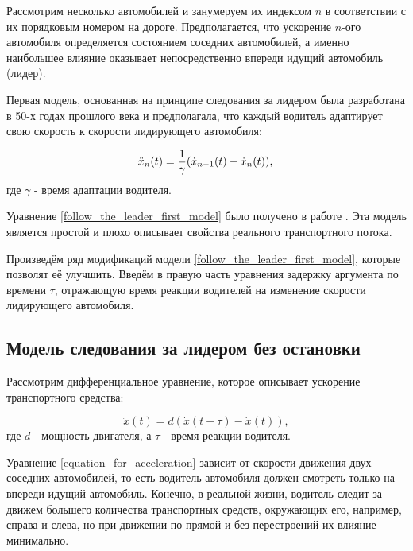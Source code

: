 \documentclass[12pt, a4paper]{extarticle}
\numberwithin{equation}{section}
\begin{document}
Рассмотрим несколько автомобилей и занумеруем их индексом $n$ в соответствии с их порядковым номером на дороге. Предполагается, что ускорение $n$-ого автомобиля определяется состоянием соседних автомобилей, а именно наибольшее влияние оказывает непосредственно впереди идущий автомобиль (лидер).

Первая модель, основанная на принципе следования за лидером была разработана в 50-х годах прошлого века и предполагала, что каждый водитель адаптирует свою скорость к скорости лидирующего автомобиля:

\begin{equation} \label{follow_the_leader_first_model}
\ddot{x}_n(t) = \dfrac{1}{\gamma} (\dot{x}_{n-1}(t) - \dot{x}_{n}(t)), \\ 
\end{equation}
где $\gamma$ - время адаптации водителя.

Уравнение \eqref{follow_the_leader_first_model} было получено в работе  \cite{FirstFollowTheLeaderModel}. Эта модель является простой и плохо описывает свойства реального транспортного потока.

Произведём ряд модификаций модели \eqref{follow_the_leader_first_model}, которые позволят её улучшить. Введём в правую часть уравнения задержку аргумента по времени $\tau$, отражающую время реакции водителей на изменение скорости лидирующего автомобиля.  



\subsection{Модель следования за лидером без остановки}

Рассмотрим дифференциальное уравнение, которое описывает ускорение транспортного средства:

\begin{equation} \label{equation_for_acceleration}
\ddot{x}(t) = d (\dot{x}(t-\tau)-\dot{x}(t)),
\end{equation}
где $d$ - мощность двигателя, а $\tau$ - время реакции водителя.

Уравнение \eqref{equation_for_acceleration} зависит от скорости движения двух соседних автомобилей, то есть водитель автомобиля должен смотреть только на впереди идущий автомобиль. Конечно, в реальной жизни, водитель следит за движем большего количества транспортных средств, окружающих его, например, справа и слева, но при движении по прямой и без перестроений их влияние минимально.
\end{document}
